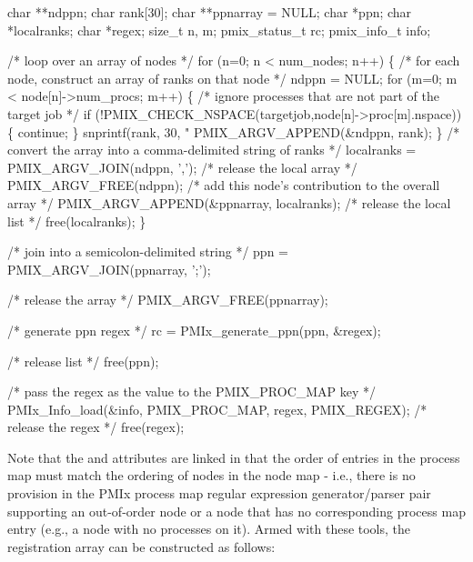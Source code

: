 \cspecificstart
\begin{codepar}
char **ndppn;
char rank[30];
char **ppnarray = NULL;
char *ppn;
char *localranks;
char *regex;
size_t n, m;
pmix_status_t rc;
pmix_info_t info;

/* loop over an array of nodes */
for (n=0; n < num_nodes; n++) \{
    /* for each node, construct an array of ranks on that node */
    ndppn = NULL;
    for (m=0; m < node[n]->num_procs; m++) \{
        /* ignore processes that are not part of the target job */
        if (!PMIX_CHECK_NSPACE(targetjob,node[n]->proc[m].nspace)) \{
            continue;
        \}
        snprintf(rank, 30, "%
        PMIX_ARGV_APPEND(&ndppn, rank);
    \}
    /* convert the array into a comma-delimited string of ranks */
    localranks = PMIX_ARGV_JOIN(ndppn, ',');
    /* release the local array */
    PMIX_ARGV_FREE(ndppn);
    /* add this node's contribution to the overall array */
    PMIX_ARGV_APPEND(&ppnarray, localranks);
    /* release the local list */
    free(localranks);
\}

/* join into a semicolon-delimited string */
ppn = PMIX_ARGV_JOIN(ppnarray, ';');

/* release the array */
PMIX_ARGV_FREE(ppnarray);

/* generate ppn regex */
rc = PMIx_generate_ppn(ppn, &regex);

/* release list */
free(ppn);

/* pass the regex as the value to the PMIX_PROC_MAP key */
PMIx_Info_load(&info, PMIX_PROC_MAP, regex, PMIX_REGEX);
/* release the regex */
free(regex);
\end{codepar}
\cspecificend

Note that the  and  attributes are linked in that the order of entries in the process map must match the ordering of nodes in the node map - i.e., there is no provision in the \ac{PMIx} process map regular expression generator/parser pair supporting an out-of-order node or a node that has no corresponding process map entry (e.g., a node with no processes on it). Armed with these tools, the registration  array can be constructed as follows:

